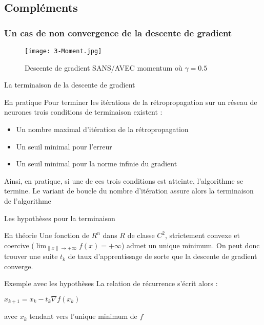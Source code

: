 \subsection{Compléments}

\begin{frame}
    \frametitle{Un cas de non convergence de la descente de gradient}
    \begin{figure}
        \centering
        \texttt{[image: 3-Moment.jpg]}
        \caption{Descente de gradient SANS/AVEC momentum où $\gamma = 0.5$}
    \end{figure}
\end{frame}

\begin{frame}{La terminaison de la descente de gradient}
    \begin{block}{En pratique}
        Pour terminer les itérations de la rétropropagation sur un réseau de neurones trois conditions de terminaison existent :
        \begin{itemize}
            \item Un nombre maximal d'itération de la rétropropagation
            \item Un seuil minimal pour l'erreur
            \item Un seuil minimal pour la norme infinie du gradient
        \end{itemize}
        Ainsi, en pratique, si une de ces trois conditions est atteinte, l'algorithme se termine. Le variant de boucle du nombre d'itération assure alors la terminaison de l'algorithme
    \end{block}
\end{frame}

\begin{frame}{Les hypothèses pour la terminaison}
    \begin{alertblock}{En théorie}
        Une fonction de $R^n$ dans $R$ de classe $C^2$, strictement convexe et coercive ($\lim_{\lVert x \rVert \to+\infty} f(x) = +\infty$) admet un unique minimum. On peut donc trouver une suite $t_k$ de taux d'apprentissage de sorte que la descente de gradient converge.
    \end{alertblock}
    \begin{exampleblock}{Exemple avec les hypothèses}
        La relation de récurrence s'écrit alors : \\
        \begin{center}
            \centering
                $x_{k+1} = x_k - t_k \nabla f(x_k)$
        \end{center}
        avec $x_k$ tendant vers l'unique minimum de $f$
    \end{exampleblock}
\end{frame}

